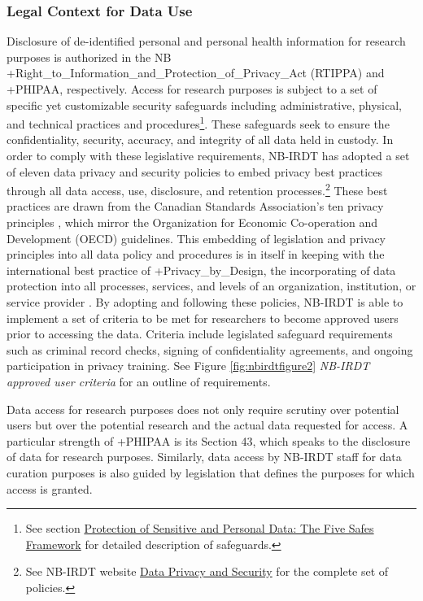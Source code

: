 \documentclass[
]{WileySix}
\begin{document}
\hypertarget{legal-context-for-data-use-2}{%
\subsubsection{Legal Context for Data Use}\label{legal-context-for-data-use-2}}

Disclosure of de-identified personal and personal health information for research purposes is authorized in the NB +Right\_to\_Information\_and\_Protection\_of\_Privacy\_Act\textbar{} (RTIPPA) and +PHIPAA\textbar, respectively. Access for research purposes is subject to a set of specific yet customizable security safeguards including administrative, physical, and technical practices and procedures\footnote{See section \protect\hyperlink{protection-of-sensitive-and-personal-data-the-five-safes-framework-8}{Protection of Sensitive and Personal Data: The Five Safes Framework} for detailed description of safeguards.}. These safeguards seek to ensure the confidentiality, security, accuracy, and integrity of all data held in custody. In order to comply with these legislative requirements, NB-IRDT has adopted a set of eleven data privacy and security policies to embed privacy best practices through all data access, use, disclosure, and retention processes.\footnote{See NB-IRDT website \href{https://www.nbirdt.ca/data-privacy-and-security}{Data Privacy and Security} for the complete set of policies.} These best practices are drawn from the Canadian Standards Association's ten privacy principles \citep{governmentofcanada2000a, officeoftheprivacycommissionerofcanada2019}, which mirror the Organization for Economic Co-operation and Development (OECD) guidelines. This embedding of legislation and privacy principles into all data policy and procedures is in itself in keeping with the international best practice of +Privacy\_by\_Design\textbar, the incorporating of data protection into all processes, services, and levels of an organization, institution, or service provider \citep{hertzman2012}. By adopting and following these policies, NB-IRDT is able to implement a set of criteria to be met for researchers to become approved users prior to accessing the data. Criteria include legislated safeguard requirements such as criminal record checks, signing of confidentiality agreements, and ongoing participation in privacy training. See Figure \ref{fig:nbirdtfigure2} \emph{NB-IRDT approved user criteria} for an outline of requirements.

Data access for research purposes does not only require scrutiny over potential users but over the potential research and the actual data requested for access. A particular strength of +PHIPAA\textbar{} is its Section 43, which speaks to the disclosure of data for research purposes. Similarly, data access by NB-IRDT staff for data curation purposes is also guided by legislation that defines the purposes for which access is granted.
\end{document}
